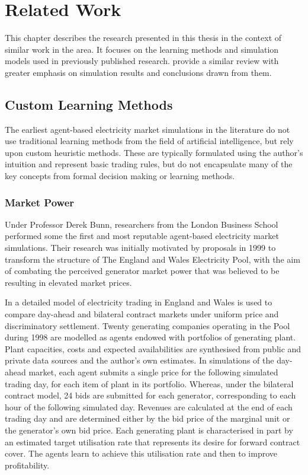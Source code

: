 \chapter{Related Work}
\label{ch:related_work}
This chapter describes the research presented in this thesis in the context of
similar work in the area.  It focuses on the learning methods and simulation
models used in previously published research.   provide a
similar review with greater emphasis on simulation results and conclusions drawn
from them.

\section{Custom Learning Methods}
The earliest agent-based electricity market simulations in the literature do not
use traditional learning methods from the field of artificial intelligence, but
rely upon custom heuristic methods.  These are typically formulated using the
author's intuition and represent basic trading rules, but do not encapsulate
many of the key concepts from formal decision making or learning methods.

\subsection{Market Power}
Under Professor Derek Bunn, researchers from the London Business School
performed some the first and most reputable agent-based electricity market
simulations.  Their research was initially motivated by proposals in 1999 to
transform the structure of The England and Wales Electricity Pool, with the aim
of combating the perceived generator market power that was believed to be
resulting in elevated market prices.

In  a detailed model of electricity trading in England and
Wales is used to compare day-ahead and bilateral contract markets under uniform
price and discriminatory settlement.  Twenty generating companies operating in
the Pool during 1998 are modelled as agents endowed with portfolios of
generating plant.  Plant capacities, costs and expected availabilities are
synthesised from public and private data sources and the author's own estimates.
 In simulations of the day-ahead market, each agent submits a single price for
the following simulated trading day, for each item of plant in its portfolio.
Whereas, under the bilateral contract model, 24 bids are submitted for each
generator, corresponding to each hour of the following simulated day.  Revenues
are calculated at the end of each trading day and are determined either by the
bid price of the marginal unit or the generator's own bid price.  Each
generating plant is characterised in part by an estimated target utilisation
rate that represents its desire for forward contract cover.  The agents learn to
achieve this utilisation rate and then to improve profitability.

